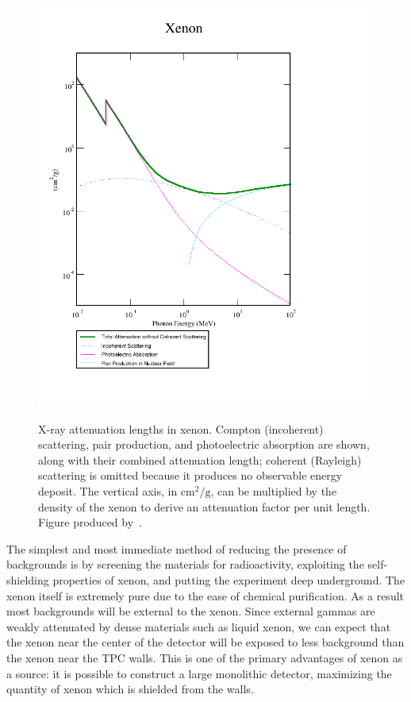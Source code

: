 \begin{figure}
\begin{center}
\includegraphics[keepaspectratio=true,width=\textwidth]{XrayAttenuationXenon.png}
\end{center}
\renewcommand{\baselinestretch}{1}
\small\normalsize
\begin{quote}
\caption{X-ray attenuation lengths in xenon.  Compton (incoherent) scattering, pair production, and photoelectric absorption are shown, along with their combined attenuation length; coherent (Rayleigh) scattering is omitted because it produces no observable energy deposit.  The vertical axis, in $\text{cm}^2/\text{g}$, can be multiplied by the density of the xenon to derive an attenuation factor per unit length.  Figure produced by~\cite{XcomXenonAttenuation}.}
\label{fig:XrayAttenuationXenon}
\end{quote}
\end{figure}
\renewcommand{\baselinestretch}{2}
\small\normalsize

The simplest and most immediate method of reducing the presence of backgrounds is by screening the materials for radioactivity, exploiting the self-shielding properties of xenon, and putting the experiment deep underground.  The xenon itself is extremely pure due to the ease of chemical purification.  As a result most backgrounds will be external to the xenon.  Since external gammas are weakly attenuated by dense materials such as liquid xenon, we can expect that the xenon near the center of the detector will be exposed to less background than the xenon near the TPC walls.  This is one of the primary advantages of xenon as a source: it is possible to construct a large monolithic detector, maximizing the quantity of xenon which is shielded from the walls.

